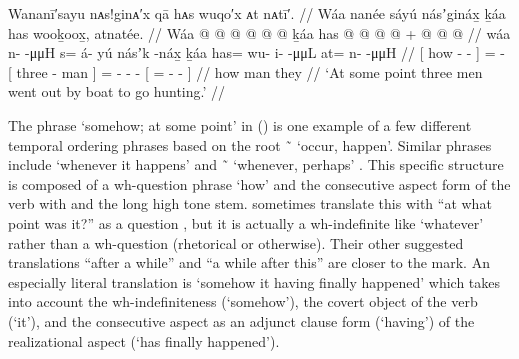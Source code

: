 \ex\label{ex:106-3-three-men-went-hunting}%
%
\begingl
	\glpreamble	Wananī′sayu nᴀs!ginᴀ′x qā hᴀs wuqo′x ᴀt nᴀtī′. //
	\glpreamble	Wáa nanée sáyú násʼgináx̱ ḵáa has wooḵoox̱, atnatée. //
	\gla	{} Wáa  @ {} @ {} @ {} {}  @ {} @ {}
			{}  @ {} ḵáa {}
			has @  @ {} @ {} @ {} +
			{}  @ {} @ {} @ {} {} //
	\glb	{} wáa n-  -μμH {} {} s= á- yú
			{} násʼk -náx̱ ḵáa {}
			has= wu- i-  -μμL
			{} at= n-  -μμH {} //
	\glc	{}[ how -  - \· {}] =  -
			{}[ three - man {}]
			= - -  -
			{}[ = -  - {}] //
	\gld	{} how  {} {} {} {} {}  {}
			{}  {} man {}
			they  {} {} {}
			{}  {} {} {} {} //
	\glft	‘At some point three men went out by boat to go hunting.’
		//
\endgl
\xe

The phrase  ‘somehow; at some point’ in (\lastx) is one example of a few different temporal ordering phrases based on the root  \~\  ‘occur, happen’.
Similar phrases include  ‘whenever it happens’ and  \~\  ‘whenever, perhaps’ \parencite[04/120]{leer:1973}.
This specific structure is composed of a wh-question phrase  ‘how’ and the consecutive aspect form of the verb with  and the long high tone  stem.
\citeauthor{dauenhauer:1987} sometimes translate this with “at what point was it?” as a question \parencite[35–36]{dauenhauer:1987}, but it is actually a wh-indefinite like  ‘whatever’ rather than a wh-question (rhetorical or otherwise).
Their other suggested translations “after a while” and “a while after this” are closer to the mark.
An especially literal translation is ‘somehow it having finally happened’ which takes into account the wh-indefiniteness (‘somehow’), the covert object of the verb (‘it’), and the consecutive aspect as an adjunct clause form (‘having’) of the realizational aspect (‘has finally happened’).

